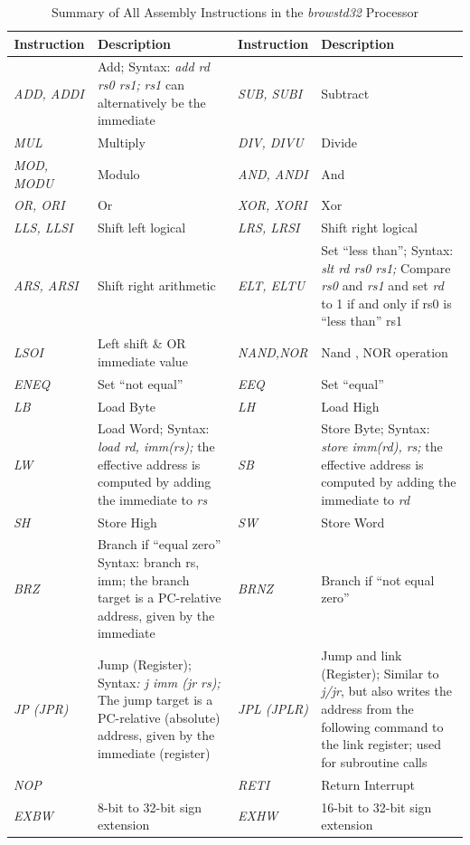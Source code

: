 \begin{table}[!htb]
	\centering
	\begin{tabular}{|l|p{5cm}|l|p{5cm}|}
		\hline
		\multicolumn{1}{|c|}{\textbf{Instruction}} & \textbf{Description} & {\textbf{Instruction}} & \textbf{Description}                                                                       \\ \hline
		\emph{ADD, ADDI} & Add; Syntax: \emph{add rd rs0 rs1;} \emph{rs1} can
		alternatively be the immediate & \emph{SUB, SUBI} &
		Subtract\\\hline
		\emph{MUL} & Multiply & \emph{DIV, DIVU} & Divide\\\hline
		\emph{MOD, MODU} & Modulo & \emph{AND, ANDI} & And\\\hline
		\emph{OR, ORI} & Or & \emph{XOR, XORI} & Xor\\\hline
		\emph{LLS, LLSI} & Shift left logical & \emph{LRS, LRSI} & Shift right
		logical\\\hline
		\emph{ARS, ARSI} & Shift right arithmetic & \emph{ELT, ELTU} & Set
		``less than''; Syntax: \emph{slt rd rs0 rs1;} Compare \emph{rs0} and
		\emph{rs1} and set \emph{rd} to 1 if and only if rs0 is ``less than''
		rs1\\\hline
		\emph{LSOI} & Left shift \& OR immediate value & \emph{NAND,NOR} & Nand
		, NOR operation\\\hline
		\emph{ENEQ} & Set ``not equal'' & \emph{EEQ} & Set
		``equal''\\\hline
		\emph{LB} & Load Byte & \emph{LH} & Load High\\\hline
		\emph{LW} & Load Word; Syntax: \emph{load rd, imm(rs);} the effective
		address is computed by adding the immediate to \emph{rs} & \emph{SB} &
		Store Byte; Syntax: \emph{store imm(rd), rs;} the effective address is
		computed by adding the immediate to \emph{rd}\\\hline
		\emph{SH} & Store High & \emph{SW} & Store Word\\\hline
		\emph{BRZ} & Branch if ``equal zero'' Syntax: branch rs, imm; the branch target is a PC-relative address, given by the immediate
		& \emph{BRNZ} & Branch if ``not equal zero''\\\hline
		\emph{JP (JPR)} & Jump (Register); Syntax\emph{: j imm (jr rs);} The
		jump target is a PC-relative (absolute) address, given by the immediate
		(register) & \emph{JPL (JPLR)} & Jump and link (Register); Similar to
		\emph{j/jr}, but also writes the address from the following command to
		the link register; used for subroutine calls\\\hline
		\emph{NOP} & & \emph{RETI} & Return Interrupt\\\hline
		\emph{EXBW} & 8-bit to 32-bit sign extension & \emph{EXHW} & 16-bit to
		32-bit sign extension\\\hline
	\end{tabular}
	\caption{Summary of All Assembly Instructions in the \emph{browstd32} Processor}
	\label{fig:fig34}
\end{table}
